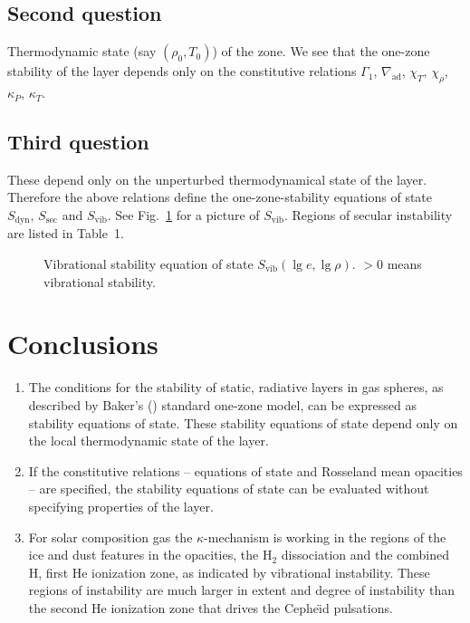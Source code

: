 \documentclass{layout}
\begin{document}
\subsection{Second question}
   Thermodynamic state (say $(\rho_0, T_0)$) of the zone.
   We see that the one-zone stability of the layer depends only on
   the constitutive relations $\Gamma_1$,
   $\nabla_{\mathrm{ad}}$, $\chi_T^{},\,\chi_\rho^{}$,
   $\kappa_P^{},\,\kappa_T^{}$.

\subsection{Third question}
   These depend only on the unperturbed
   thermodynamical state of the layer. Therefore the above relations
   define the one-zone-stability equations of state
   $S_{\mathrm{dyn}},\,S_{\mathrm{sec}}$
   and $S_{\mathrm{vib}}$. See Fig.~\ref{FigVibStab} for a picture of
   $S_{\mathrm{vib}}$. Regions of secular instability are
   listed in Table~1.

%
   \begin{figure}
   \centering
      \caption{Vibrational stability equation of state
               $S_{\mathrm{vib}}(\lg e, \lg \rho)$.
               $>0$ means vibrational stability.
              }
         \label{FigVibStab}
   \end{figure}
%

\section{Conclusions}

   \begin{enumerate}
      \item The conditions for the stability of static, radiative
         layers in gas spheres, as described by Baker's (\cite{baker})
         standard one-zone model, can be expressed as stability
         equations of state. These stability equations of state depend
         only on the local thermodynamic state of the layer.
      \item If the constitutive relations -- equations of state and
         Rosseland mean opacities -- are specified, the stability
         equations of state can be evaluated without specifying
         properties of the layer.
      \item For solar composition gas the $\kappa$-mechanism is
         working in the regions of the ice and dust features
         in the opacities, the $\mathrm{H}_2$ dissociation and the
         combined H, first He ionization zone, as
         indicated by vibrational instability. These regions
         of instability are much larger in extent and degree of
         instability than the second He ionization zone
         that drives the Cephe{\"\i}d pulsations.
   \end{enumerate}
\end{document}
